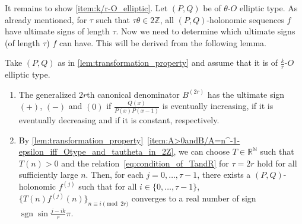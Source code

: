 \documentclass[a4paper,UKenglish,cleveref,autoref,thm-restate]{lipics-v2021}
\newcommand{\R}{\mathbb{R}}
\newcommand{\N}{\mathbb{N}}
\newcommand{\Z}{\mathbb{Z}}
\DeclareMathOperator{\sgn}{sgn}
\begin{document}
It remains to show \eqref{item:k/r-O_elliptic}. Let $(P, Q)$ be of $\theta$-$O$ elliptic type. As already mentioned, for $\tau$ such that $\tau \theta \in 2 \Z$, all $(P, Q)$-holonomic sequences $f$ have ultimate signs of length $\tau$. Now we need to determine which ultimate signs (of length $\tau$) $f$ can have. This will be derived from the following lemma. 

\begin{lemma} \label{lem:Tg^j_converge}
Take $(P, Q)$ as in \cref{lem:transformation_property} and assume that it is of $\frac{k}r$-$O$ elliptic type. 
\begin{enumerate}[(1)]
\item \label{item:sgnR=sgnq}
The generalized $2r$th canonical denominator $B^{(2r)}$ has the ultimate sign $(+)$, $(-)$ and $(0)$ if $\frac{Q(x)}{P(x)P(x-1)}$ is eventually increasing, if it is eventually decreasing and if it is constant, respectively. 

\item \label{item:Tf^j}
By \cref{lem:transformation_property}~\eqref{item:A>0andB/A=n^-1-epsilon_iff_Otype_and_tautheta_in_2Z}, we can choose $T \in \R^{\N}$ such that $T(n) > 0$ and the relation~\eqref{eq:condition_of_TandR} for $\tau = 2r$ hold for all sufficiently large $n$. Then, for each $j = 0, \dots, \tau-1$, there exists a $(P, Q)$-holonomic $f^{(j)}$ such that for all $i \in \{0, \dots, \tau-1\}$, $\{ T(n)f^{(j)}(n) \}_{n \equiv i \pmod{2r}}$ converges to a real number of sign $\sgn \sin \frac{j - ik}r \pi$.
\end{enumerate}
\end{lemma}
\end{document}
